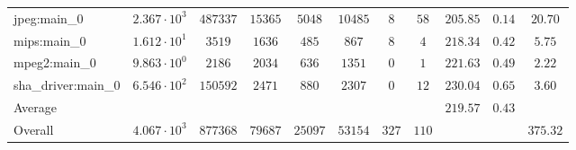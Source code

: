 \begin{tabular}{|l|c|c|c|c|c|c|c|c|c|c|}
jpeg:main\_0            & $ 2.367 \cdot 10^{3}  $ & $ 487337 $ & $ 15365 $ & $ 5048  $ & $ 10485 $ & $ 8   $ & $ 58  $ & $ 205.85      $ & $ 0.14    $ & $ 20.70   $ \\
mips:main\_0            & $ 1.612 \cdot 10^{1}  $ & $ 3519   $ & $ 1636  $ & $ 485   $ & $ 867   $ & $ 8   $ & $ 4   $ & $ 218.34      $ & $ 0.42    $ & $ 5.75    $ \\
mpeg2:main\_0           & $ 9.863 \cdot 10^{0}  $ & $ 2186   $ & $ 2034  $ & $ 636   $ & $ 1351  $ & $ 0   $ & $ 1   $ & $ 221.63      $ & $ 0.49    $ & $ 2.22    $ \\
sha\_driver:main\_0     & $ 6.546 \cdot 10^{2}  $ & $ 150592 $ & $ 2471  $ & $ 880   $ & $ 2307  $ & $ 0   $ & $ 12  $ & $ 230.04      $ & $ 0.65    $ & $ 3.60    $ \\
\hline
Average                 & $                     $ & $        $ & $       $ & $       $ & $       $ & $     $ & $     $ & $ 219.57      $ & $ 0.43    $ & $         $ \\
\hline
Overall                 & $ 4.067 \cdot 10^{3}  $ & $ 877368 $ & $ 79687 $ & $ 25097 $ & $ 53154 $ & $ 327 $ & $ 110 $ & $             $ & $         $ & $ 375.32  $ \\
\hline
\end{tabular}
